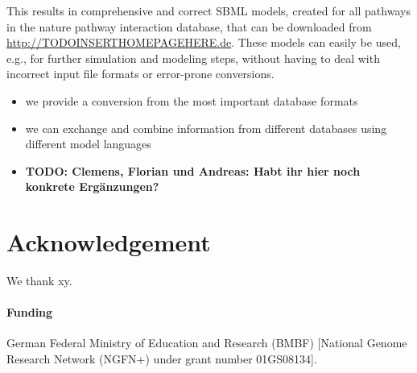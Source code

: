 \documentclass{bioinfo}
\begin{document}
This results in comprehensive and correct SBML models, created for all pathways in the nature pathway interaction database, that can be downloaded from \href{http://TODO_INSERT_HOMEPAGE_HERE.de}{http://TODOINSERTHOMEPAGEHERE.de}. These models can easily be used, e.g., for further simulation and modeling steps, without having to deal with incorrect input file formats or error-prone conversions.


\begin{itemize}
\item we provide a conversion from the most important database formats
\item we can exchange and combine information from different databases using different model languages
\item \textbf{TODO: Clemens, Florian und Andreas: Habt ihr hier noch konkrete Erg\"anzungen?}
\end{itemize}


\section*{Acknowledgement}
We thank xy.

\paragraph{Funding\textcolon} German Federal Ministry of Education and Research (BMBF) [National Genome Research Network (NGFN+) under grant number 01GS08134].


%
%
%
%
%
%

\end{document}
